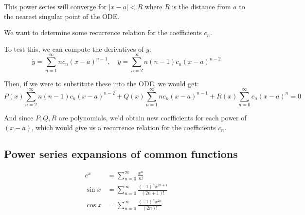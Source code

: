 This power series will converge for $|x-a| < R$ where $R$ is the distance from $a$ to the nearest singular point of the ODE.


We want to determine some recurrence relation for the coefficients $c_n$.

To test this, we can compute the derivatives of $y$:
\begin{equation*}
\dot{y} = \sum_{n=1}^{\infty} n c_n (x-a)^{n-1}, \quad
\ddot{y} = \sum_{n=2}^{\infty} n (n-1) c_n (x-a)^{n-2}
\end{equation*}

Then, if we were to substitute these into the ODE, we would get:
\begin{equation*}
P(x) \sum_{n=2}^{\infty} n (n-1) c_n (x-a)^{n-2} + Q(x) \sum_{n=1}^{\infty} n c_n (x-a)^{n-1} + R(x) \sum_{n=0}^{\infty} c_n (x-a)^n = 0
\end{equation*}

And since $P, Q, R$ are polynomials, we'd obtain new coefficients for each power of $(x-a)$, which would give us a recurrence relation for the coefficients $c_n$.

\begin{mdframed}
\subsection{Power series expansions of common functions}
\begin{align*}
e^x &= \sum_{n=0}^{\infty} \frac{x^n}{n!} \\
\sin x &= \sum_{n=0}^{\infty} \frac{(-1)^n x^{2n+1}}{(2n+1)!} \\
\cos x &= \sum_{n=0}^{\infty} \frac{(-1)^n x^{2n}}{(2n)!}
\end{align*}
\end{mdframed}

